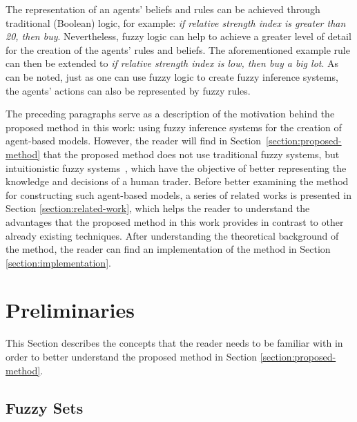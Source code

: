 \documentclass{ieeeaccess}
\begin{document}
The representation of an agents' beliefs and rules can be achieved through
traditional (Boolean) logic, for example: \textit{if relative strength index is
greater than 20, then buy}. Nevertheless, fuzzy logic can help to achieve a
greater level of detail for the creation of the agents' rules and beliefs. The
aforementioned example rule can then be extended to \textit{if relative strength
index is low, then buy a big lot}. As can be noted, just as one can use fuzzy
logic to create fuzzy inference systems, the agents' actions can also be
represented by fuzzy rules.

The preceding paragraphs serve as a description of the motivation behind the
proposed method in this work: using fuzzy inference systems for the creation of
agent-based models. However, the reader will find in Section~\ref{section:proposed-method} that the proposed method does not use traditional
fuzzy systems, but intuitionistic fuzzy systems~\cite{Atanassov1986}, which have
the objective of better representing the knowledge and decisions of a human
trader. Before better examining the method for constructing such agent-based
models, a series of related works is presented in Section
\ref{section:related-work}, which helps the reader to understand the advantages
that the proposed method in this work provides in contrast to other already
existing techniques. After understanding the theoretical background of the
method, the reader can find an implementation of the method in Section
\ref{section:implementation}.
%

\section{Preliminaries}
\label{section:preliminaries}
%

This Section describes the concepts that the reader needs to be familiar with in
order to better understand the proposed method in Section
\ref{section:proposed-method}.%

\subsection{Fuzzy Sets}
\label{subsection:fuzzy-sets}
\end{document}

